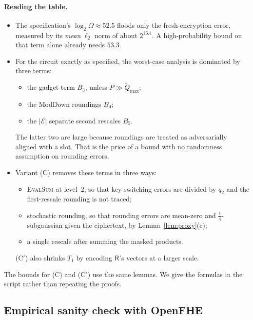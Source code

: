 \paragraph{Reading the table.}
\begin{itemize}[nosep]
  \item The specification's $\log_2\Omega\approx52.5$ floods only the fresh-encryption error, measured by its \emph{mean} $\ell_2$ norm of about $2^{16.4}$. A high-probability bound on that term alone already needs $53.3$.
  \item For the circuit exactly as specified, the worst-case analysis is dominated by three terms:
    \begin{itemize}[nosep]
      \item the gadget term $B_3$, unless $P\gg\tilde Q_{\max}$;
      \item the ModDown roundings $B_4$;
      \item the $|\mathcal E|$ separate second rescales $B_5$.
    \end{itemize}
  The latter two are large because roundings are treated as adversarially aligned with a slot. That is the price of a bound with no randomness assumption on rounding errors.
  \item Variant (C) removes these terms in three ways:
    \begin{itemize}[nosep]
      \item \textsc{EvalSum} at level~2, so that key-switching errors are divided by $q_2$ and the first-rescale rounding is not traced;
      \item stochastic rounding, so that rounding errors are mean-zero and $\frac14$-subgaussian given the ciphertext, by Lemma~\ref{lem:proxy}(c);
      \item a single rescale after summing the masked products.
    \end{itemize}
  (C$'$) also shrinks $T_1$ by encoding $\mathsf{R}$'s vectors at a larger scale.
\end{itemize}
The bounds for (C) and (C$'$) use the same lemmas. We give the formulas in the script rather than repeating the proofs. 

\subsection{Empirical sanity check with OpenFHE}
\label{sec:empirical}

